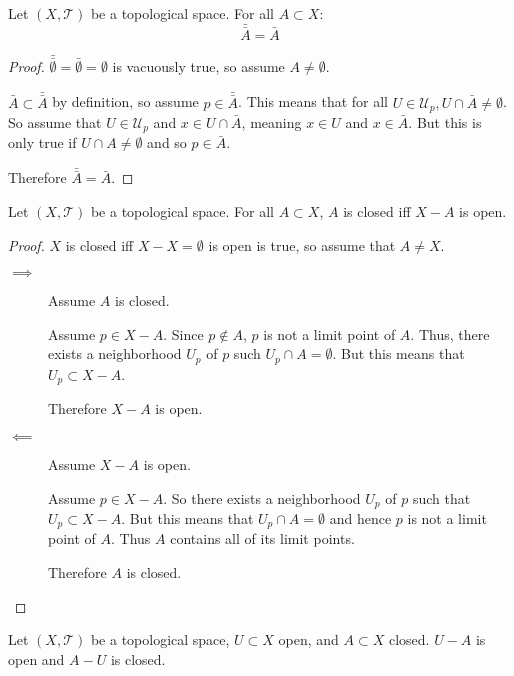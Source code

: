\documentclass[letterpaper,12pt,fleqn]{article}
\newcommand{\T}{\mathscr{T}}
\newcommand{\U}{\mathcal{U}}
\begin{document}
\begin{theorem}
  Let \((X,\T)\) be a topological space.  For all \(A\subset X\):
  \[\bar{\bar{A}}=\bar{A}\]
\end{theorem}

\begin{proof}
  \(\bar{\bar{\emptyset}}=\bar{\emptyset}=\emptyset\) is vacuously true, so assume \(A\ne\emptyset\).

  \(\bar{A}\subset\bar{\bar{A}}\) by definition, so assume \(p\in\bar{\bar{A}}\).  This means that for all
  \(U\in\U_p,U\cap\bar{A}\ne\emptyset\).  So assume that \(U\in\U_p\) and \(x\in U\cap\bar{A}\), meaning \(x\in U\)
  and \(x\in\bar{A}\).  But this is only true if \(U\cap A\ne\emptyset\) and so \(p\in\bar{A}\).

  Therefore \(\bar{\bar{A}}=\bar{A}\).
\end{proof}

\begin{theorem}
  Let \((X,\T)\) be a topological space.  For all \(A\subset X\), \(A\) is closed iff \(X-A\) is open.
\end{theorem}

\begin{proof}
  \(X\) is closed iff \(X-X=\emptyset\) is open is true, so assume that \(A\ne X\).

  \begin{description}
  \item[\(\implies\)] Assume \(A\) is closed.

    Assume \(p\in X-A\).  Since \(p\notin A\), \(p\) is not a limit point of \(A\).  Thus, there exists a neighborhood
    \(U_p\) of \(p\) such \(U_p\cap A=\emptyset\).  But this means that \(U_p\subset X-A\).

    Therefore \(X-A\) is open.

  \item[\(\impliedby\)] Assume \(X-A\) is open.

    Assume \(p\in X-A\).  So there exists a neighborhood \(U_p\) of \(p\) such that \(U_p\subset X-A\).  But this
    means that \(U_p\cap A=\emptyset\) and hence \(p\) is not a limit point of \(A\).  Thus \(A\) contains all of
    its limit points.

    Therefore \(A\) is closed.
  \end{description}
\end{proof}

\begin{theorem}
  Let \((X,\T)\) be a topological space, \(U\subset X\) open, and \(A\subset X\) closed.  \(U-A\) is open and
  \(A-U\) is closed.
\end{theorem}
\end{document}
